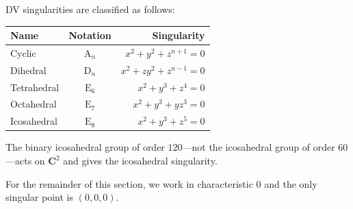 \documentclass [11 pt, oneside] {article}
\begin{document}
DV singularities are classified as follows:
\begin{center}
	\begin{tabular}{lcr}
		Name		& Notation	& Singularity\\
		\midrule
		Cyclic		& $\operatorname{A}_n$	& $x^2+y^2+z^{n+1}=0$\\
		Dihedral		& $\operatorname{D}_n$& $x^2+zy^2+z^{n-1}=0$\\
		Tetrahedral	& $\operatorname{E}_6$	& $x^2+y^3+z^4=0$\\
		Octahedral	& $\operatorname{E}_7$	& $x^2+y^3+yz^3=0$\\
		Icosahedral	& $\operatorname{E}_8$	& $x^2+y^3+z^5=0$
	\end{tabular}
\end{center}

The binary icosahedral group of order $120$---not the icosahedral group of order $60$---acts on $\mathbf{C}^2$ and gives the icosahedral singularity. 
\begin{remark}
	For the remainder of this section, we work in characteristic $0$ and the only singular point is $(0,0,0)$.
\end{remark}
\end{document}
